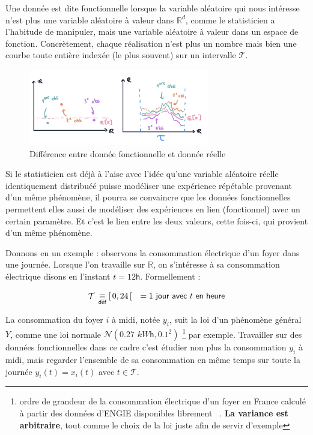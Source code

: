 
Une donnée est dite fonctionnelle lorsque la variable aléatoire qui nous intéresse n'est plus une variable aléatoire à valeur dans $\mathds R^d$, comme le statisticien a l'habitude de manipuler, mais une variable aléatoire à valeur dans un espace de fonction. Concrètement, chaque réalisation n'est plus un nombre mais bien une courbe toute entière indexée (le plus souvent) sur un intervalle $\mathcal T$.

\begin{figure}[H]
	\centering
	\includegraphics[width=0.7\textwidth]{Images/motivation/donneesRvsFD.jpg}
	\caption{Différence entre donnée fonctionnelle et donnée réelle}
	\label{img:RvsFD}
\end{figure}

Si le statisticien est déjà à l'aise avec l'idée qu'une variable aléatoire réelle identiquement distribuéé puisse modéliser une expérience répétable provenant d'un même phénomène, il pourra se convaincre que les données fonctionnelles permettent elles aussi de modéliser des expériences en lien (fonctionnel) avec un certain paramètre. Et c'est le lien entre les deux valeurs, cette fois-ci, qui provient d'un même phénomène.

\largeskip

Donnons en un exemple : observons la consommation électrique d'un foyer dans une journée. Lorsque l'on travaille sur $\mathds R$, on s'intéresse à sa consommation électrique disons en l'instant $t = 12\mathsf{h}$. Formellement :

\begin{equation*}
	\mathcal T \, \isdef [\, 0,24 \,[ \quad = \textsf{1 jour avec } t \textsf{ en heure}
\end{equation*}

La consommation du foyer $i$ à midi, notée $y_i$, suit la loi d'un phénomène général $Y$, comme une loi normale $\mathcal N\left( 0.27 \, \, kW\mathsf h, 0.1^2 \right)$
%
\footnote{ ordre de grandeur de la consommation électrique d'un foyer en France calculé à partir des données d'ENGIE disponibles librement ~\cite{engie-data-conso-moy-par-an}. \textbf{La variance est arbitraire}, tout comme le choix de la loi juste afin de servir d'exemple }
%
par exemple. Travailler sur des données fonctionnelles dans ce cadre c'est étudier non plus la consommation $y_i$ à midi, mais regarder l'ensemble de sa consommation en même temps sur toute la journée $y_i(t) = x_i(t)$ avec $t \in \mathcal T$.

